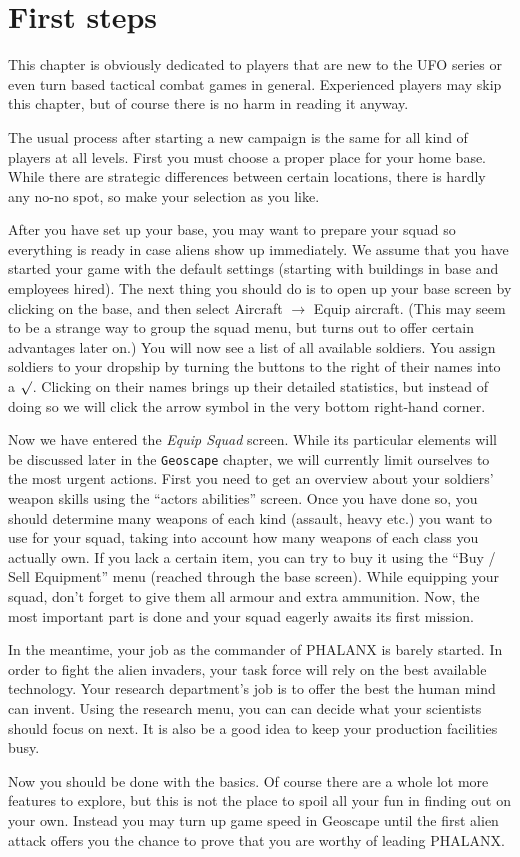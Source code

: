 \section{First steps}
This chapter is obviously dedicated to players that are new to the UFO series or even turn based tactical combat games in general. Experienced players may skip this chapter, but of course there is no harm in reading it anyway.

The usual process after starting a new campaign is the same for all kind of players at all levels. First you must choose a proper place for your home base. While there are strategic differences between certain locations, there is hardly any no-no spot, so make your selection as you like.

After you have set up your base, you may want to prepare your squad so everything is ready in case aliens show up immediately. We assume that you have started your game with the default settings (starting with buildings in base and employees hired). The next thing you should do is to open up your base screen by clicking on the base, and then select Aircraft $\rightarrow$ Equip aircraft. (This may seem to be a strange way to group the squad menu, but turns out to offer certain advantages later on.) You will now see a list of all available soldiers. You assign soldiers to your dropship by turning the  buttons to the right of their names into a $\surd$. Clicking on their names brings up their detailed statistics, but instead of doing so we will click the arrow symbol in the very bottom right-hand corner.

Now we have entered the \emph{Equip Squad} screen. While its particular elements will be discussed later in the \texttt{Geoscape} chapter, we will currently limit ourselves to the most urgent actions. First you need to get an overview about your soldiers' weapon skills using the ``actors abilities'' screen. Once you have done so, you should determine many weapons of each kind (assault, heavy etc.) you want to use for your squad, taking into account how many weapons of each class you actually own. If you lack a certain item, you can try to buy it using the ``Buy / Sell Equipment'' menu (reached through the base screen). While equipping your squad, don't forget to give them all armour and extra ammunition. Now, the most important part is done and your squad eagerly awaits its first mission.

In the meantime, your job as the commander of PHALANX is barely started. In order to fight the alien invaders, your task force will rely on the best available technology. Your research department's job is to offer the best the human mind can invent. Using the research menu, you can can decide what your scientists should focus on next. It is also be a good idea to keep your production facilities busy.

Now you should be done with the basics. Of course there are a whole lot more features to explore, but this is not the place to spoil all your fun in finding out on your own. Instead you may turn up game speed in Geoscape until the first alien attack offers you the chance to prove that you are worthy of leading PHALANX.

